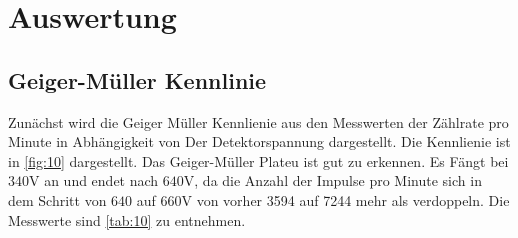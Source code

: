 \section{Auswertung}
\label{sec:Auswertung}
\subsection{Geiger-Müller Kennlinie}
Zunächst wird die Geiger Müller Kennlienie aus den Messwerten 
der Zählrate pro Minute in Abhängigkeit von Der Detektorspannung
dargestellt. Die Kennlienie ist in \autoref{fig:10} dargestellt. 
Das Geiger-Müller Plateu ist gut zu erkennen. Es Fängt bei 
$340\unit{\volt}$ an und endet nach $640\unit{\volt}$, da die Anzahl 
der Impulse pro Minute sich in dem Schritt von $640$ auf $660\unit{\volt}$
von vorher 3594 auf 7244 mehr als verdoppeln. Die Messwerte sind 
\autoref{tab:10} zu entnehmen. 

